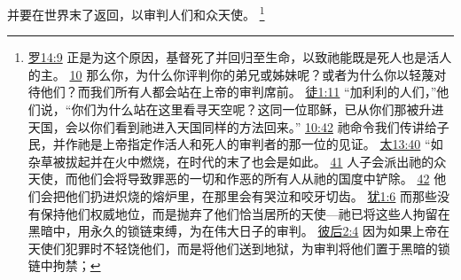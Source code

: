 \documentclass[12pt, a4paper, oneside]{ctexart}
\begin{document}
	并要在世界末了返回，以审判人们和众天使。
	\footnote {
		\href{https://biblehub.com/romans/14-9.htm}{罗14:9} 正是为这个原因，基督死了并回归至生命，以致祂能既是死人也是活人的主。
		\href{https://biblehub.com/romans/14-10.htm}{10} 那么你，为什么你评判你的弟兄或姊妹呢？或者为什么你以轻蔑对待他们？而我们所有人都会站在上帝的审判席前。
		\href{https://biblehub.com/acts/1-11.htm}{徒1:11} “加利利的人们，”他们说，“你们为什么站在这里看寻天空呢？这同一位耶稣，已从你们那被升进天国，会以你们看到祂进入天国同样的方法回来。”
		\href{https://biblehub.com/acts/10-42.htm}{10:42} 祂命令我们传讲给子民，并作祂是上帝指定作活人和死人的审判者的那一位的见证。
		\href{https://biblehub.com/matthew/13-40.htm}{太13:40} “如杂草被拔起并在火中燃烧，在时代的末了也会是如此。
		\href{https://biblehub.com/matthew/13-41.htm}{41} 人子会派出祂的众天使，而他们会将导致罪恶的一切和作恶的所有人从祂的国度中铲除。
		\href{https://biblehub.com/matthew/13-42.htm}{42} 他们会把他们扔进炽烧的熔炉里，在那里会有哭泣和咬牙切齿。
		\href{https://biblehub.com/jude/1-6.htm}{犹1:6} 而那些没有保持他们权威地位，而是抛弃了他们恰当居所的天使---祂已将这些人拘留在黑暗中，用永久的锁链束缚，为在伟大日子的审判。
		\href{https://biblehub.com/2_peter/2-4.htm}{彼后2:4} 因为如果上帝在天使们犯罪时不轻饶他们，而是将他们送到地狱，为审判将他们置于黑暗的锁链中拘禁；
	}
\end{document}
